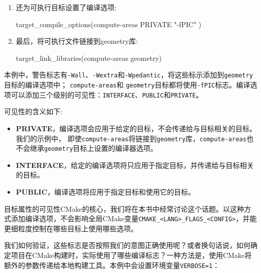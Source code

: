 \begin{enumerate}
\item 还为可执行目标设置了编译选项:

\begin{codebox}[cmake]
target_compile_options(compute-areas
  PRIVATE
    "-fPIC"
  )
\end{codebox}

\item 最后，将可执行文件链接到geometry库:

\begin{codebox}[cmake]
target_link_libraries(compute-areas geometry)
\end{codebox}

\end{enumerate}


本例中，警告标志有\texttt{-Wall}、\texttt{-Wextra}和\texttt{-Wpedantic}，将这些标示添加到\texttt{geometry}目标的编译选项中； \texttt{compute-areas}和 \texttt{geometry}目标都将使用\texttt{-fPIC}标志。编译选项可以添加三个级别的可见性：\texttt{INTERFACE}、\texttt{PUBLIC}和\texttt{PRIVATE}。

可见性的含义如下:

\begin{itemize}
\item \textbf{PRIVATE}，编译选项会应用于给定的目标，不会传递给与目标相关的目标。我们的示例中， 即使\texttt{compute-areas}将链接到\texttt{geometry}库，\texttt{compute-areas}也不会继承\texttt{geometry}目标上设置的编译器选项。

\item \textbf{INTERFACE}，给定的编译选项将只应用于指定目标，并传递给与目标相关的目标。

\item \textbf{PUBLIC}，编译选项将应用于指定目标和使用它的目标。

\end{itemize}

目标属性的可见性CMake的核心，我们将在本书中经常讨论这个话题。以这种方式添加编译选项，不会影响全局CMake变量\texttt{CMAKE\_<LANG>\_FLAGS\_<CONFIG>}，并能更细粒度控制在哪些目标上使用哪些选项。

我们如何验证，这些标志是否按照我们的意图正确使用呢？或者换句话说，如何确定项目在CMake构建时，实际使用了哪些编译标志？一种方法是，使用CMake将额外的参数传递给本地构建工具。本例中会设置环境变量\texttt{VERBOSE=1}：

